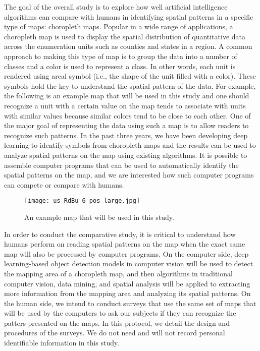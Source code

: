 The goal of the overall study is to explore how well artificial intelligence algorithms can compare with humans in identifying spatial patterns in a specific type of maps: choropleth maps. Popular in a wide range of applications, a choropleth map is used to display the spatial distribution of quantitative data across the enumeration units such as counties and states in a region. A common approach to making this type of map is to group the data into a number of classes and a color is used to represent a class. In other words, each unit is rendered using areal symbol (i.e., the shape of the unit filled with a color). These symbols hold the key to understand the spatial pattern of the data. For example, the following is an example map that will be used in this study and one should recognize a unit with a certain value on the map tends to associate with units with similar values because similar colors tend to be close to each other. One of the major goal of representing the data using such a map is to allow readers to recognize such patterns. In the past three years, we have been developing deep learning to identify symbols from choropleth maps and the results can be used to analyze spatial patterns on the map using existing algorithms. It is possible to assemble computer programs that can be used to automatically identify the spatial patterns on the map, and we are interested how such computer programs can compete or compare with humans.

\begin{figure}[!ht]
    \centering
    \texttt{[image: us\_RdBu\_6\_pos\_large.jpg]}
    \caption{An example map that will be used in this study.}
    \label{fig:MLP}
  \end{figure}

In order to conduct the comparative study, it is critical to understand how humans perform on reading spatial patterns on the map when the exact same map will also be processed by computer programs. On the computer side, deep learning-based object detection models in computer vision will be used to detect the mapping area of a choropleth map, and then algorithms in traditional computer vision, data mining, and spatial analysis will be applied to extracting more information from the mapping area and analyzing its spatial patterns. On the human side, we intend to conduct surveys that use the same set of maps that will be used by the computers to ask our subjects if they can recognize the patters presented on the maps. In this protocol, we detail the design and procedures of the surveys. We do not need and will not record personal identifiable information in this study.

